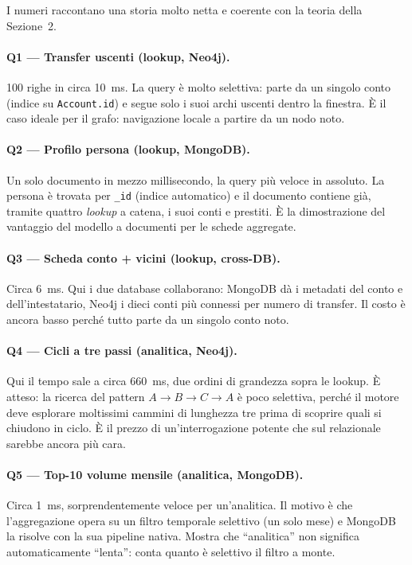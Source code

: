 \documentclass[11pt,a4paper]{article}
\begin{document}
I numeri raccontano una storia molto netta e coerente con la teoria della
Sezione~2.

\paragraph{Q1 --- Transfer uscenti (lookup, Neo4j).} 100 righe in circa 10~ms.
La query \`e molto selettiva: parte da un singolo conto (indice su
\texttt{Account.id}) e segue solo i suoi archi uscenti dentro la finestra. \`E il
caso ideale per il grafo: navigazione locale a partire da un nodo noto.

\paragraph{Q2 --- Profilo persona (lookup, MongoDB).} Un solo documento in
mezzo millisecondo, la query pi\`u veloce in assoluto. La persona \`e trovata per
\texttt{\_id} (indice automatico) e il documento contiene gi\`a, tramite quattro
\emph{lookup} a catena, i suoi conti e prestiti. \`E la dimostrazione del
vantaggio del modello a documenti per le schede aggregate.

\paragraph{Q3 --- Scheda conto + vicini (lookup, cross-DB).} Circa 6~ms. Qui i
due database collaborano: MongoDB d\`a i metadati del conto e dell'intestatario,
Neo4j i dieci conti pi\`u connessi per numero di transfer. Il costo \`e ancora
basso perch\'e tutto parte da un singolo conto noto.

\paragraph{Q4 --- Cicli a tre passi (analitica, Neo4j).} Qui il tempo sale a
circa 660~ms, due ordini di grandezza sopra le lookup. \`E atteso: la ricerca
del pattern $A\to B\to C\to A$ \`e poco selettiva, perch\'e il motore deve
esplorare moltissimi cammini di lunghezza tre prima di scoprire quali si chiudono
in ciclo. \`E il prezzo di un'interrogazione potente che sul relazionale sarebbe
ancora pi\`u cara.

\paragraph{Q5 --- Top-10 volume mensile (analitica, MongoDB).} Circa 1~ms,
sorprendentemente veloce per un'analitica. Il motivo \`e che l'aggregazione opera
su un filtro temporale selettivo (un solo mese) e MongoDB la risolve con la sua
pipeline nativa. Mostra che ``analitica'' non significa automaticamente ``lenta'':
conta quanto \`e selettivo il filtro a monte.
\end{document}
